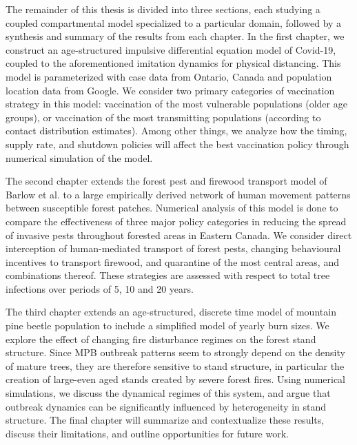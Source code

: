 The remainder of this thesis is divided into three sections, each studying a coupled compartmental model specialized to a particular domain, followed by a synthesis and summary of the results from each chapter. In the first chapter, we construct an age-structured impulsive differential equation model of Covid-19, coupled to the aforementioned imitation dynamics for physical distancing. This model is parameterized with case data from Ontario, Canada and population location data from Google. We consider two primary categories of vaccination strategy in this model: vaccination of the most vulnerable populations (older age groups), or vaccination of the most transmitting populations (according to contact distribution estimates). Among other things, we analyze how the timing, supply rate, and shutdown policies will affect the best vaccination policy through numerical simulation of the model.

The second chapter extends the forest pest and firewood transport model of Barlow et al. \cite{barlow2014modelling} to a large empirically derived network of human movement patterns between susceptible forest patches. Numerical analysis of this model is done to compare the effectiveness of three major policy categories in reducing the spread of invasive pests throughout forested areas in Eastern Canada. We consider direct interception of human-mediated transport of forest pests, changing behavioural incentives to transport firewood, and quarantine of the most central areas, and combinations thereof. These strategies are assessed with respect to total tree infections over periods of 5, 10 and 20 years.

The third chapter extends an age-structured, discrete time model of mountain pine beetle population \cite{duncan2015model} to include a simplified model of yearly burn sizes. We explore the effect of changing fire disturbance regimes on the forest stand structure. Since MPB outbreak patterns seem to strongly depend on the density of mature trees, they are therefore sensitive to stand structure, in particular the creation of large-even aged stands created by severe forest fires. Using numerical simulations, we discuss the dynamical regimes of this system, and argue that outbreak dynamics can be significantly influenced by heterogeneity in stand structure. The final chapter will summarize and contextualize these results, discuss their limitations, and outline opportunities for future work.